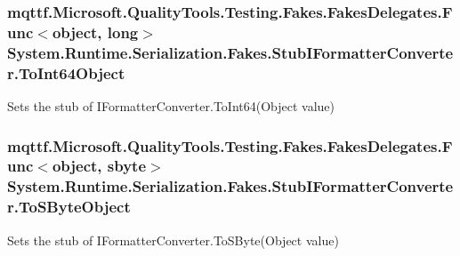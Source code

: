 \hypertarget{class_system_1_1_runtime_1_1_serialization_1_1_fakes_1_1_stub_i_formatter_converter_a5df5060b8e033726f8519aaffc888c07}{
\subsubsection[{To\-Int64\-Object}]{\setlength{\rightskip}{0pt plus 5cm}mqttf.\-Microsoft.\-Quality\-Tools.\-Testing.\-Fakes.\-Fakes\-Delegates.\-Func$<$object, long$>$ System.\-Runtime.\-Serialization.\-Fakes.\-Stub\-I\-Formatter\-Converter.\-To\-Int64\-Object}}\label{class_system_1_1_runtime_1_1_serialization_1_1_fakes_1_1_stub_i_formatter_converter_a5df5060b8e033726f8519aaffc888c07}


Sets the stub of I\-Formatter\-Converter.\-To\-Int64(\-Object value)

\hypertarget{class_system_1_1_runtime_1_1_serialization_1_1_fakes_1_1_stub_i_formatter_converter_a36920022f648474378f9ea1ac81de680}{
\subsubsection[{To\-S\-Byte\-Object}]{\setlength{\rightskip}{0pt plus 5cm}mqttf.\-Microsoft.\-Quality\-Tools.\-Testing.\-Fakes.\-Fakes\-Delegates.\-Func$<$object, sbyte$>$ System.\-Runtime.\-Serialization.\-Fakes.\-Stub\-I\-Formatter\-Converter.\-To\-S\-Byte\-Object}}\label{class_system_1_1_runtime_1_1_serialization_1_1_fakes_1_1_stub_i_formatter_converter_a36920022f648474378f9ea1ac81de680}


Sets the stub of I\-Formatter\-Converter.\-To\-S\-Byte(\-Object value)

